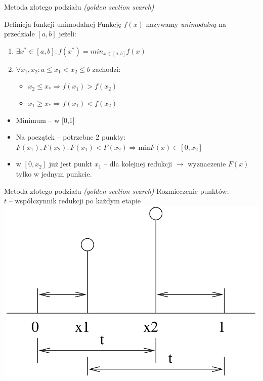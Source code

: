   \begin{frame}{Metoda złotego podziału \emph{(golden section search)}}
    \begin{block}{Definicja funkcji unimodalnej}
      Funkcję $f(x)$ nazywamy \emph{unimodalną} na przedziale
      $[a{,}b]$ jeżeli:
      \begin{enumerate}
        \item $\exists x^{*}\in [a{,}b] : f(x^{*}) = min_{x \in [a{,}b]}f(x)$
        \item $\forall x_{1}{,}x_{2} : a \leq x_{1} < x_{2} \leq b$ zachodzi:
        \begin{itemize}
          \item $x_{2} \leq x_{*} \Rightarrow f(x_{1}) > f(x_{2})$
          \item $x_{1} \geq x_{*} \Rightarrow f(x_{1}) < f(x_{2})$
        \end{itemize}
      \end{enumerate}
    \end{block}
    \begin{itemize}
      \item Minimum -- w [0,1]
      \item Na początek -- potrzebne 2 punkty:
      $F(x_1),F(x_2) : F(x_1) < F(x_2) \Rightarrow \text{min} F(x)\in [0{,}x_2]$
      \item w $[0{,}x_2]$ już jest punkt $x_1$ -- dla kolejnej
      redukcji $\to$ wyznaczenie $F(x)$ tylko w jednym punkcie.
    \end{itemize}

  \end{frame}

  \begin{frame}{Metoda złotego podziału \emph{(golden section search)}}
    Rozmieczenie punktów:\\
    $t$ -- współczynnik redukcji po każdym etapie\\
    \centering
    \includegraphics[height=0.6\textheight]{img/17/f_uni2}
  \end{frame}

